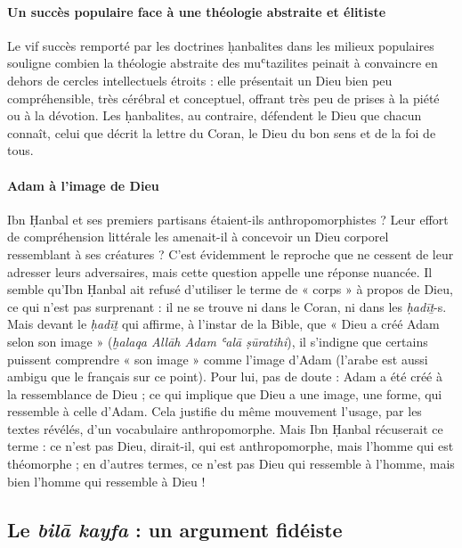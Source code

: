 \paragraph{Un succès populaire face à une théologie abstraite et élitiste} Le vif succès remporté
par les doctrines ḥanbalites dans les milieux populaires souligne
combien la théologie abstraite des muʿtazilites peinait à convaincre en
dehors de cercles intellectuels étroits : elle présentait un Dieu bien
peu compréhensible, très cérébral et conceptuel, offrant très peu de
prises à la piété ou à la dévotion. Les ḥanbalites, au contraire,
défendent le Dieu que chacun connaît, celui que décrit la lettre du
Coran, le Dieu du bon sens et de la foi de tous.

\paragraph{Adam à l'image de Dieu}Ibn Ḥanbal et ses premiers partisans étaient-ils anthropomorphistes ?
Leur effort de
compréhension littérale les amenait-il à concevoir un Dieu corporel
ressemblant à ses créatures ? C'est évidemment le reproche que ne
cessent de leur adresser leurs adversaires, mais cette question appelle
une réponse nuancée. Il semble qu'Ibn Ḥanbal ait refusé d'utiliser
le terme de « corps » à propos de Dieu, ce qui n'est pas surprenant : il
ne se trouve ni dans le Coran, ni dans les \emph{ḥadīṯ}-s. Mais devant
le \emph{ḥadīṯ} qui affirme, à l'instar de la Bible, que « Dieu a créé
Adam selon son image » (\emph{ḫalaqa Allāh Adam ʿalā ṣūratihi}), il
s'indigne que certains puissent comprendre « son image » comme l'image
d'Adam (l'arabe est aussi ambigu que le français sur ce point). Pour
lui, pas de doute : Adam a été créé à la ressemblance de Dieu ; ce qui
implique que Dieu a une image, une forme, qui ressemble à celle d'Adam.
Cela justifie du même mouvement l'usage, par les textes révélés, d'un
vocabulaire anthropomorphe. Mais Ibn Ḥanbal récuserait ce terme : ce
n'est pas Dieu, dirait-il, qui est anthropomorphe, mais l'homme qui est
théomorphe ; en d'autres termes, ce n'est pas Dieu qui ressemble à
l'homme, mais bien l'homme qui ressemble à Dieu !



  
  \subsection{Le \emph{bilā kayfa} : un argument fidéiste}
  



